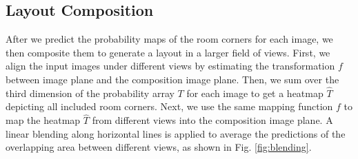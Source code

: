 



\subsection{Layout Composition}
\label{sec:merging}
After we predict the probability maps of the room corners for each image, we then composite them to generate a layout in a larger field of views. 
First, we align the input images under different views by estimating the transformation $f$ between image plane and the composition image plane. 
Then, we sum over the third dimension  of the probability array $T$ for each image to get a heatmap $\hat{T}$ depicting all included room corners. 
Next, we use the same mapping function $f$ to map the heatmap $\hat{T}$ from different views into the composition image plane. 
A linear blending along horizontal lines  is applied to average the predictions of the overlapping area between different views, as shown in Fig. \ref{fig:blending}. 


